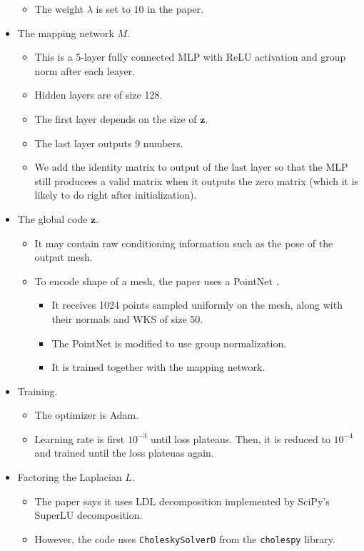 \documentclass[10pt]{article}
\newcommand{\ve}[1]{\mathbf{#1}}
\begin{document}
\begin{itemize}
\begin{itemize}
        \item The weight $\lambda$ is set to $10$ in the paper.
    \end{itemize}

    \item The mapping network $M$.
    \begin{itemize}
        \item This is a 5-layer fully connected MLP with ReLU activation and group norm after each leayer.
        \item Hidden layers are of size 128.
        \item The first layer depends on the size of $\ve{z}$.
        \item The last layer outputs 9 numbers.
        \item We add the identity matrix to output of the last layer so that the MLP still producees a valid matrix when it outputs the zero matrix (which it is likely to do right after initialization).        
    \end{itemize}

    \item The global code $\ve{z}$.
    \begin{itemize}
        \item It may contain raw conditioning information such as the pose of the output mesh.
        \item To encode shape of a mesh, the paper uses a PointNet \cite{Qi:PointNet:2017}.
        \begin{itemize}
            \item It receives 1024 points sampled uniformly on the mesh, along with their normals and WKS of size 50.
            \item The PointNet is modified to use group normalization.
            \item It is trained together with the mapping network.
        \end{itemize}
    \end{itemize}

    \item Training.
    \begin{itemize}
        \item The optimizer is Adam.
        \item Learning rate is first $10^{-3}$ until loss plateaus. Then, it is reduced to $10^{-4}$ and trained until the loss plateuas again.        
    \end{itemize}

    \item Factoring the Laplacian $L$.
    \begin{itemize}
        \item The paper says it uses LDL decomposition implemented by SciPy's SuperLU decomposition.
        \item However, the code uses \texttt{CholeskySolverD} from the \texttt{cholespy} library.
    \end{itemize}

\end{itemize}



  
\end{document}
